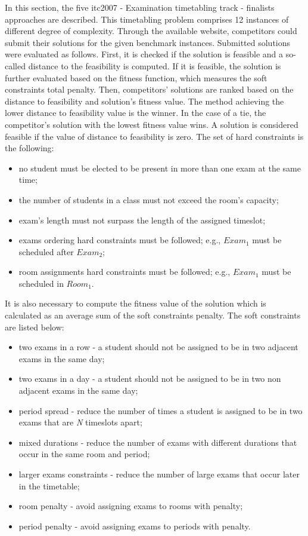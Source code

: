 In this section, the five \gls{itc2007} - Examination timetabling track - finalists approaches are described. This timetabling problem comprises 12 instances of different degree of complexity. Through the available website, competitors could submit their solutions for the given benchmark instances. Submitted solutions were evaluated as follows. First, it is checked if the solution is feasible and a so-called distance to the feasibility is computed. If it is feasible, the solution is further evaluated based on the fitness function, which measures the soft constraints total penalty. Then, competitors' solutions are ranked based on the distance to feasibility and solution's fitness value. The method achieving the lower distance to feasibility value is the winner. In the case of a tie, the competitor's solution with the lowest fitness value wins. A solution is considered feasible if the value of distance to feasibility is zero. The set of hard constraints is the following:
\begin{itemize}
	\item no student must be elected to be present in more than one exam at the same time;
	\item the number of students in a class must not exceed the room's capacity;
	\item exam's length must not surpass the length of the assigned timeslot;
	\item exams ordering hard constraints must be followed; e.g., $Exam_1$ must be scheduled after $Exam_2$;
	\item room assignments hard constraints must be followed; e.g., 	$Exam_1$ must be scheduled in $Room_1$.
\end{itemize}

It is also necessary to compute the fitness value of the solution which is calculated as an average sum of the soft constraints penalty. The soft constraints are listed below:
\begin{itemize}
	\item two exams in a row - a student should not be assigned to be in two adjacent exams in the same day;
	\item two exams in a day - a student should not be assigned to be in two non adjacent exams in the same day;
	\item period spread - reduce the number of times a student is assigned to be in two exams that are \textit{N} timeslots apart;
	\item mixed durations - reduce the number of exams with different durations that occur in the same room and period;
	\item larger exams constraints - reduce the number of large exams that occur later in the timetable;
	\item room penalty - avoid assigning exams to rooms with penalty;
	\item period penalty - avoid assigning exams to periods with penalty.
\end{itemize}

